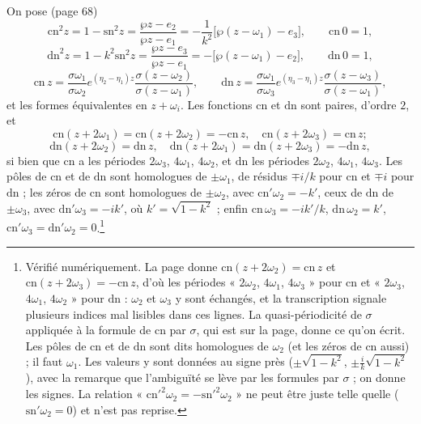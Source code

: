 \documentclass[11pt,a4paper]{article}
\begin{document}
On pose (page 68)
\[
\mathrm{cn}^2 z = 1 - \mathrm{sn}^2 z = \frac{\wp z - e_2}{\wp z - e_1} =
-\frac{1}{k^2}\bigl[\wp(z - \omega_1) - e_3\bigr], \qquad \mathrm{cn}\,0 = 1,
\]
\[
\mathrm{dn}^2 z = 1 - k^2\mathrm{sn}^2 z = \frac{\wp z - e_3}{\wp z - e_1} =
-\bigl[\wp(z - \omega_1) - e_2\bigr], \qquad \mathrm{dn}\,0 = 1,
\]
\[
\mathrm{cn}\,z = \frac{\sigma\omega_1}{\sigma\omega_2}e^{(\eta_2 - \eta_1)z}
\frac{\sigma(z - \omega_2)}{\sigma(z - \omega_1)},
\qquad
\mathrm{dn}\,z = \frac{\sigma\omega_1}{\sigma\omega_3}e^{(\eta_3 - \eta_1)z}
\frac{\sigma(z - \omega_3)}{\sigma(z - \omega_1)},
\]
et les formes équivalentes en $z + \omega_i$. Les fonctions $\mathrm{cn}$ et
$\mathrm{dn}$ sont paires, d'ordre $2$, et
\[
\mathrm{cn}(z + 2\omega_1) = \mathrm{cn}(z + 2\omega_2) = -\mathrm{cn}\,z,\quad
\mathrm{cn}(z + 2\omega_3) = \mathrm{cn}\,z ;
\]
\[
\mathrm{dn}(z + 2\omega_2) = \mathrm{dn}\,z,\quad \mathrm{dn}(z + 2\omega_1) =
\mathrm{dn}(z + 2\omega_3) = -\mathrm{dn}\,z ,
\]
si bien que $\mathrm{cn}$ a les périodes $2\omega_3$, $4\omega_1$, $4\omega_2$, et
$\mathrm{dn}$ les périodes $2\omega_2$, $4\omega_1$, $4\omega_3$. Les pôles de
$\mathrm{cn}$ et de $\mathrm{dn}$ sont homologues de $\pm\omega_1$, de résidus
$\mp i/k$ pour $\mathrm{cn}$ et $\mp i$ pour $\mathrm{dn}$ ; les zéros de
$\mathrm{cn}$ sont homologues de $\pm\omega_2$, avec $\mathrm{cn}'\omega_2 = -k'$,
ceux de $\mathrm{dn}$ de $\pm\omega_3$, avec $\mathrm{dn}'\omega_3 = -ik'$, où
$k' = \sqrt{1 - k^2}$ ; enfin $\mathrm{cn}\,\omega_3 = -ik'/k$, $\mathrm{dn}\,\omega_2 =
k'$, $\mathrm{cn}'\omega_3 = \mathrm{dn}'\omega_2 = 0$.\footnote{Vérifié
numériquement. La page donne $\mathrm{cn}(z + 2\omega_2) = \mathrm{cn}\,z$ et
$\mathrm{cn}(z + 2\omega_3) = -\mathrm{cn}\,z$, d'où les périodes « $2\omega_2$,
$4\omega_1$, $4\omega_3$ » pour $\mathrm{cn}$ et « $2\omega_3$, $4\omega_1$,
$4\omega_2$ » pour $\mathrm{dn}$ : $\omega_2$ et $\omega_3$ y sont échangés, et la
transcription signale plusieurs indices mal lisibles dans ces lignes. La
quasi-périodicité de $\sigma$ appliquée à la formule de $\mathrm{cn}$ par
$\sigma$, qui est sur la page, donne ce qu'on écrit. Les pôles de $\mathrm{cn}$
et de $\mathrm{dn}$ sont dits homologues de $\omega_2$ (et les zéros de
$\mathrm{cn}$ aussi) ; il faut $\omega_1$. Les valeurs y sont données au signe
près ($\pm\sqrt{1-k^2}$, $\pm\frac{i}{k}\sqrt{1-k^2}$), avec la remarque que
l'ambiguïté se lève par les formules par $\sigma$ ; on donne les signes. La
relation « $\mathrm{cn}'^2\omega_2 = -\mathrm{sn}'^2\omega_2$ » ne peut être
juste telle quelle ($\mathrm{sn}'\omega_2 = 0$) et n'est pas reprise.}
\end{document}
